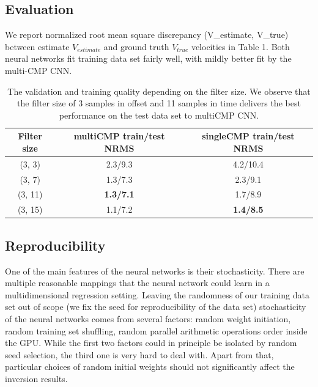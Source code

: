 \documentclass[paper,twocolomn]{geophysics}
\begin{document}

\subsection{Evaluation}
We report normalized root mean square discrepancy
\beq
{}(V_{estimate}, V_{true}) \equiv {}
\eeq
between estimate $V_{estimate}$ and ground truth $V_{true}$ velocities in Table 1. 
Both neural networks fit training data set fairly well, with mildly better fit by the multi-CMP CNN.

\begin{table}
    \begin{center}
	\begin{tabular}{||c | c | c ||}
		\hline
		Filter size & multiCMP train/test NRMS & singleCMP train/test NRMS \\ \hline\hline
		(3, 3)    & 2.3/9.3                  & 4.2/10.4                   \\ \hline
		(3, 7)    & 1.3/7.3                  & 2.3/9.1                   \\ \hline
		(3, 11)   & \textbf{1.3/7.1}         & 1.7/8.9                   \\ \hline
		(3, 15)   & 1.1/7.2                  & \textbf{1.4/8.5}          \\ \hline
	\end{tabular}
	\caption{The validation and training quality depending on the filter size. We observe that the filter size of 3 samples in offset and 11 samples in time delivers the best performance on the test data set to multiCMP CNN.}
	\end{center}
\end{table}


\subsection{Reproducibility}
One of the main features of the neural networks is their stochasticity. There are multiple reasonable mappings that the neural network could learn in a multidimensional regression setting. Leaving the randomness of our training data set out of scope (we fix the seed for reproducibility of the data set) stochasticity of the neural networks comes from several factors: random weight initiation, random training set shuffling, random parallel arithmetic operations order inside the GPU. While the first two factors could in principle be isolated by random seed selection, the third one is very hard to deal with. Apart from that, particular choices of random initial weights should not significantly affect the inversion results.
\end{document}
